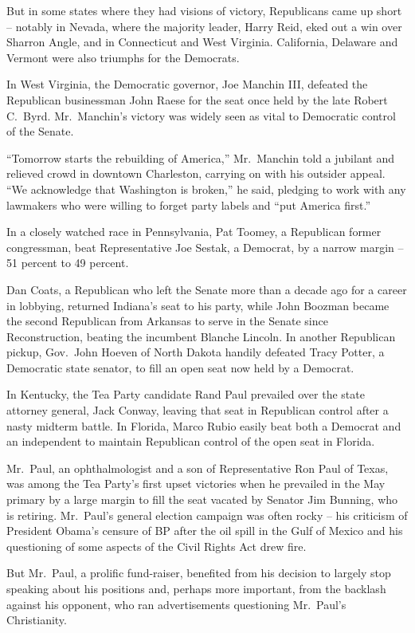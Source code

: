 ﻿\documentclass[12pt]{article}
\begin{document}
But in some states where they had visions of victory, Republicans came up short -- notably in
Nevada, where the majority leader, Harry Reid, eked out a win over Sharron Angle, and in Connecticut
and West Virginia. California, Delaware and Vermont were also triumphs for the Democrats.

In West Virginia, the Democratic governor, Joe Manchin III, defeated the Republican businessman John
Raese for the seat once held by the late Robert C.~Byrd. Mr.~Manchin's victory was widely seen as
vital to Democratic control of the Senate.

``Tomorrow starts the rebuilding of America,'' Mr.~Manchin told a jubilant and relieved crowd in
downtown Charleston, carrying on with his outsider appeal. ``We acknowledge that Washington is
broken,'' he said, pledging to work with any lawmakers who were willing to forget party labels and
``put America first.''

In a closely watched race in Pennsylvania, Pat Toomey, a Republican former congressman, beat
Representative Joe Sestak, a Democrat, by a narrow margin -- 51 percent to 49 percent.

Dan Coats, a Republican who left the Senate more than a decade ago for a career in lobbying,
returned Indiana's seat to his party, while John Boozman became the second Republican from Arkansas
to serve in the Senate since Reconstruction, beating the incumbent Blanche Lincoln. In another
Republican pickup, Gov.~John Hoeven of North Dakota handily defeated Tracy Potter, a Democratic
state senator, to fill an open seat now held by a Democrat.

In Kentucky, the Tea Party candidate Rand Paul prevailed over the state attorney general, Jack
Conway, leaving that seat in Republican control after a nasty midterm battle. In Florida, Marco
Rubio easily beat both a Democrat and an independent to maintain Republican control of the open seat
in Florida.

Mr.~Paul, an ophthalmologist and a son of Representative Ron Paul of Texas, was among the Tea
Party's first upset victories when he prevailed in the May primary by a large margin to fill the
seat vacated by Senator Jim Bunning, who is retiring. Mr.~Paul's general election campaign was often
rocky -- his criticism of President Obama's censure of BP after the oil spill in the Gulf of Mexico
and his questioning of some aspects of the Civil Rights Act drew fire.

But Mr.~Paul, a prolific fund-raiser, benefited from his decision to largely stop speaking about his
positions and, perhaps more important, from the backlash against his opponent, who ran
advertisements questioning Mr.~Paul's Christianity.
\end{document}
